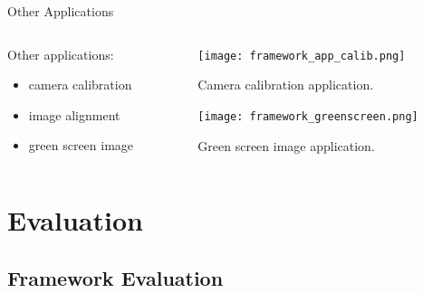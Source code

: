 \documentclass{beamer}
\begin{document}
\begin{frame}{Other Applications}
     \begin{columns}
        \begin{column}{0.5\textwidth}
           Other applications:
           \begin{itemize}
               \item camera calibration
               \item image alignment
               \item green screen image
           \end{itemize}
        \end{column}
        \begin{column}{0.4\textwidth}
            \begin{figure}
                 \texttt{[image: framework\_app\_calib.png]}
                 \caption{Camera calibration application.}
            \end{figure}
            \begin{figure}
                \texttt{[image: framework\_greenscreen.png]}
                \caption{Green screen image application.}
            \end{figure}
        \end{column}
    \end{columns}
\end{frame}

\section{Evaluation}
\subsection{Framework Evaluation}
    
\end{document}
